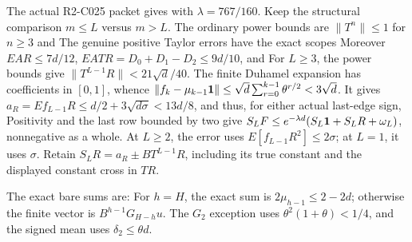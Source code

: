 The actual R2-C025 packet gives
with \(\lambda=767/160\). Keep the structural comparison \(m\le L\) versus \(m>L\). The ordinary power bounds are \(\|T^n\|\le1\) for \(n\ge3\) and
The genuine positive Taylor errors have the exact scopes
Moreover \(EAR\le7d/12\), \(EATR=D_0+D_1-D_2\le9d/10\), and
For \(L\ge3\), the power bounds give \(\|T^{L-1}R\|<21\sqrt d/40\). The finite Duhamel expansion
has coefficients in \([0,\allowbreak 1]\), whence \(\|f_k-\mu_{k-1}\mathbf1\|\le\sqrt d\sum_{r=0}^{k-1}\theta^{r/2}<3\sqrt d\). It gives \(a_R=Ef_{L-1}R\le d/2+3\sqrt{d\sigma}<13d/8\), and thus, for either actual last-edge sign,
Positivity and the last row bounded by two give \(S_LF\le e^{-\lambda d}(S_L\mathbf1+S_LR+\omega_L)\), nonnegative as a whole. At \(L\ge2\), the error uses \(E[f_{L-1}R^2]\le2\sigma\); at \(L=1\), it uses \(\sigma\). Retain \(S_LR=a_R\pm BT^{L-1}R\), including its true constant and the displayed constant cross in \(TR\).

The exact bare sums are:
For \(h=H\), the exact sum is \(2\mu_{h-1}\le2-2d\); otherwise the finite vector is \(B^{h-1}G_{H-h}u\). The \(G_2\) exception uses \(\theta^2(1+\theta)<1/4\), and the signed mean uses \(\delta_2\le\theta d\).

